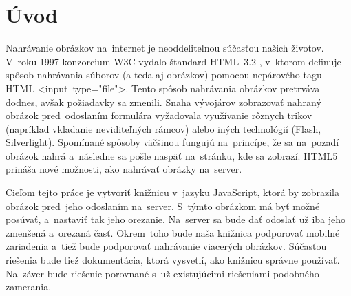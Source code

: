 \chapter{Úvod}

Nahrávanie obrázkov na~internet je neoddeliteľnou súčasťou našich životov. V~roku 1997 konzorcium W3C vydalo štandard HTML~3.2 \cite{html32}, v~ktorom definuje spôsob nahrávania súborov (a teda aj obrázkov) pomocou nepárového tagu HTML \hbox{<input type="file"\textgreater}. Tento spôsob nahrávania obrázkov pretrváva dodnes, avšak požiadavky sa zmenili. Snaha vývojárov zobrazovať nahraný obrázok pred~odoslaním formulára vyžadovala využívanie rôznych trikov (napríklad vkladanie neviditeľných rámcov) alebo iných technológií (Flash, Silverlight). Spomínané spôsoby väčšinou fungujú na~princípe, že sa na~pozadí obrázok nahrá a~následne sa pošle naspäť na~stránku, kde sa zobrazí. HTML5 prináša nové možnosti, ako nahrávať obrázky na~server.

Cieľom tejto práce je vytvoriť knižnicu v~jazyku JavaScript, ktorá by zobrazila obrázok pred~jeho odoslaním na~server. S~týmto obrázkom má byť možné posúvať, a~nastaviť tak jeho orezanie. Na~server sa bude dať odoslať už iba jeho zmenšená a~orezaná časť. Okrem~toho bude naša knižnica podporovať mobilné zariadenia a~tiež bude podporovať nahrávanie viacerých obrázkov. Súčasťou riešenia bude tiež dokumentácia, ktorá vysvetlí, ako knižnicu správne používať. Na~záver bude riešenie porovnané s~už existujúcimi riešeniami podobného zamerania.